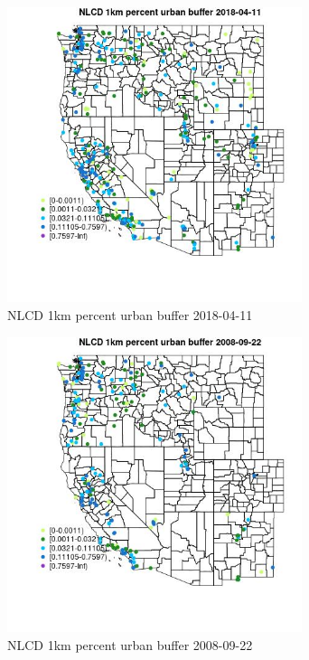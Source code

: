 \begin{figure} 
\centering  
\includegraphics[width=0.77\textwidth]{Code_Outputs/Report_ML_input_PM25_Step4_part_e_de_duplicated_aves_compiled_2019-05-18wNAs_MapObsNLCD_1km_percent_urban_buffer2018-04-11.jpg} 
\caption{\label{fig:Report_ML_input_PM25_Step4_part_e_de_duplicated_aves_compiled_2019-05-18wNAsMapObsNLCD_1km_percent_urban_buffer2018-04-11}NLCD 1km percent urban buffer 2018-04-11} 
\end{figure} 
 

\begin{figure} 
\centering  
\includegraphics[width=0.77\textwidth]{Code_Outputs/Report_ML_input_PM25_Step4_part_e_de_duplicated_aves_compiled_2019-05-18wNAs_MapObsNLCD_1km_percent_urban_buffer2008-09-22.jpg} 
\caption{\label{fig:Report_ML_input_PM25_Step4_part_e_de_duplicated_aves_compiled_2019-05-18wNAsMapObsNLCD_1km_percent_urban_buffer2008-09-22}NLCD 1km percent urban buffer 2008-09-22} 
\end{figure} 
 

